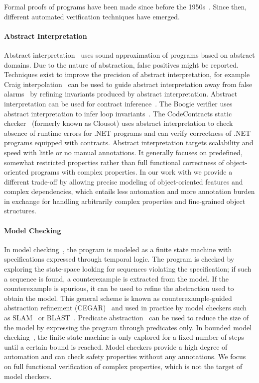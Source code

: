 Formal proofs of programs have been made since before the 1950s~\cite{MORRIS84}.
Since then, different automated verification techniques have emerged.

\paragraph{Abstract Interpretation}

Abstract interpretation~\cite{COUSOT77,COUSOT79} uses sound approximation of programs based on abstract domains.
Due to the nature of abstraction, false positives might be reported.
Techniques exist to improve the precision of abstract interpretation, for example 
Craig interpolation~\cite{CRAIG57} can be used to guide abstract interpretation away from false alarms~\cite{ALBARGHOUTHI12} by refining invariants produced by abstract interpretation.
Abstract interpretation can be used for contract inference~\cite{COUSOT11,COUSOT13}.
The Boogie verifier uses abstract interpretation to infer loop invariants~\cite{BARNETT05b}.
The CodeContracts static checker~\cite{FAEHNDRICH10,LOGOZZO12} (formerly known as Clousot) uses abstract interpretation to check absence of runtime errors for .NET programs and can verify correctness of .NET programs equipped with contracts.
Abstract interpretation targets scalability and speed with little or no manual annotations.
It generally focuses on predefined, somewhat restricted properties rather than full functional correctness of object-oriented programs with complex properties.
In our work with \AutoProof we provide a different trade-off by allowing precise modeling of object-oriented features and complex dependencies, which entails less automation and more annotation burden in exchange for handling arbitrarily complex properties and fine-grained object structures.

\paragraph{Model Checking}

In model checking~\cite{CLARKE81}, the program is modeled as a finite state machine with specifications expressed through temporal logic. 
The program is checked by exploring the state-space looking for sequences violating the specification; if such a sequence is found, a counterexample is extracted from the model.
If the counterexample is spurious, it can be used to refine the abstraction used to obtain the model.
This general scheme is known as counterexample-guided abstraction refinement (CEGAR)~\cite{CLARKE03} and used in practice by model checkers such as SLAM~\cite{BALL02} or BLAST~\cite{BEYER07}.
Predicate abstraction~\cite{GRAF97} can be used to reduce the size of the model by expressing the program through predicates only.
In bounded model checking~\cite{BIERE99,BIERE03}, the finite state machine is only explored for a fixed number of steps until a certain bound is reached.
Model checkers provide a high degree of automation and can check safety properties without any annotations.
We focus on full functional verification of complex properties, which is not the target of model checkers.


